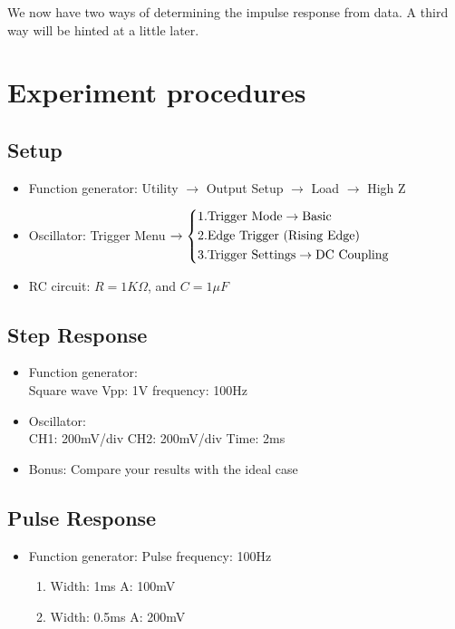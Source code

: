 \documentclass{article}
\begin{document}
We now have two ways of determining the impulse response from data. A third way will be hinted at a
little later.

\section{Experiment procedures}
\subsection*{Setup}
\begin{itemize}
	\item Function generator: Utility $\rightarrow$ Output Setup $\rightarrow$ Load $\rightarrow$ High Z
	\item Oscillator: Trigger Menu 
	$\rightarrow\left\{
	\begin{aligned}
		&\rm 1.Trigger\ Mode \rightarrow Basic \\
		&\rm 2.Edge\ Trigger\ (Rising\ Edge) \\
		&\rm 3.Trigger\ Settings \rightarrow DC\ Coupling
	\end{aligned}
	\right.$
	\item RC circuit: $R = 1 K\Omega$, and $C = 1 \mu F$
\end{itemize}

\subsection{Step Response}
\begin{itemize}
	\item Function generator:\\
	Square wave \qquad Vpp: 1V \qquad frequency: 100Hz
	\item Oscillator:\\
	CH1: 200mV/div \qquad CH2: 200mV/div \qquad Time: 2ms
	\item Bonus: Compare your results with the ideal case
\end{itemize}

\subsection{Pulse Response}
\begin{itemize}
	\item Function generator: Pulse frequency: 100Hz
	\begin{enumerate}
		\item Width: 1ms \qquad A: 100mV
		\item Width: 0.5ms \qquad A: 200mV
	\end{enumerate}
\end{itemize}
\end{document}
